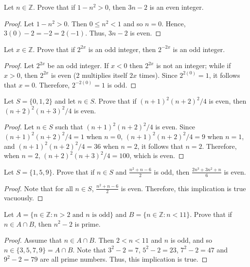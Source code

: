 \documentclass[12pt]{article}
\newcommand{\Z}{\mathbb{Z}}
\newenvironment{problem}[2][Problem]{\begin{trivlist}
		\item[\hskip \labelsep {\bfseries #1}\hskip \labelsep {\bfseries #2.}]}{\end{trivlist}}
\begin{document}
	\begin{problem}{11}
		Let $n\in \Z$. Prove that if $1-n^{2}>0$, then $3n-2$ is an even integer.
		\begin{proof}
			Let $1-n^{2}>0$. Then $0\leq n^{2}<1$ and so $n=0$. Hence, $3(0)-2=-2=2(-1)$. Thus, $3n-2$ is even.
		\end{proof}
	\end{problem}

	\begin{problem}{12}
		Let $x\in \Z$. Prove that  if $2^{2x}$ is an odd integer, then $2^{-2x}$ is an odd integer.
		\begin{proof}
			Let $2^{2x}$ be an odd integer. If $x<0$ then $2^{2x}$ is not an integer; while if $x>0$, then $2^{2x}$ is even (2 multiplies itself $2x$ times). Since $2^{2(0)}=1$, it follows that $x=0$. Therefore, $2^{-2(0)}=1$ is odd.
			
		\end{proof}
	\end{problem}

	\begin{problem}{13}
		Let $S=\{0,1,2\}$ and let $n \in S$. Prove that if $(n+1)^{2}(n+2)^{2}/4$ is even, then $(n+2)^{2}(n+3)^{2}/4$ is even.
		\begin{proof}
			Let $n\in S$ such that $(n+1)^{2}(n+2)^{2}/4$ is even. Since $(n+1)^{2}(n+2)^{2}/4=1$ when $n=0$, $(n+1)^{2}(n+2)^{2}/4=9$ when $n=1$, and $(n+1)^{2}(n+2)^{2}/4=36$ when $n=2$, it follows that $n=2$. Therefore, when $n=2$,  $(n+2)^{2}(n+3)^{2}/4=100$, which is even.
		\end{proof}
	\end{problem}

	\begin{problem}{14}
		Let $S=\{1,5,9\}$. Prove that if $n \in S$ and $\frac{n^{2}+n-6}{2}$ is odd, then $\frac{2n^{3}+3n^{2}+n}{6}$ is even.
		\begin{proof}
			Note that for all $n\in S$, $\frac{n^{2}+n-6}{2}$ is even. Therefore, this implication is true vacuously.
		\end{proof}
	\end{problem}

	\begin{problem}{15}
		Let $A=\{n\in \Z: n>2 \text{ and }n\text{ is odd}\}$ and $B=\{n\in \Z:n<11\}$. Prove that if $n\in A\cap B$, then $n^{2}-2$ is prime.
		\begin{proof}
			Assume that $n\in A\cap B$. Then $2<n<11$ and $n$ is odd, and so $n\in \{3,5,7,9\}=A\cap B$. Note that $3^{2}-2=7$, $5^{2}-2=23$, $7^{2}-2=47$ and $9^{2}-2=79$ are all prime numbers. Thus, this implication is true.
		\end{proof}
	\end{problem}
\end{document}
